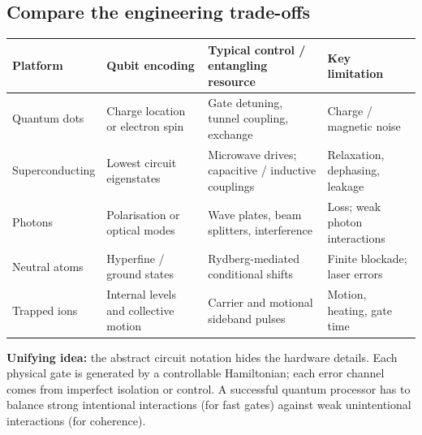 \subsection{Compare the engineering trade-offs}
\begin{center}
\small
\renewcommand{\arraystretch}{1.14}
\begin{tabularx}{\linewidth}{@{}p{22mm}p{29mm}Xp{31mm}@{}}\toprule
Platform&Qubit encoding&Typical control / entangling resource&Key limitation\\\midrule
Quantum dots&Charge location or electron spin&Gate detuning, tunnel coupling, exchange&Charge / magnetic noise\\
Superconducting&Lowest circuit eigenstates&Microwave drives; capacitive / inductive couplings&Relaxation, dephasing, leakage\\
Photons&Polarisation or optical modes&Wave plates, beam splitters, interference&Loss; weak photon interactions\\
Neutral atoms&Hyperfine / ground states&Rydberg-mediated conditional shifts&Finite blockade; laser errors\\
Trapped ions&Internal levels and collective motion&Carrier and motional sideband pulses&Motion, heating, gate time\\\bottomrule
\end{tabularx}
\end{center}
\textbf{Unifying idea:} the abstract circuit notation hides the hardware details. Each physical gate is generated by a controllable Hamiltonian; each error channel comes from imperfect isolation or control. A successful quantum processor has to balance strong intentional interactions (for fast gates) against weak unintentional interactions (for coherence).

